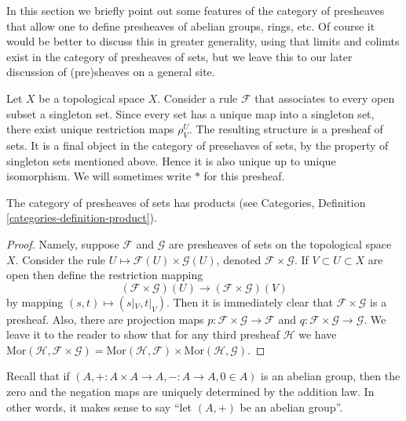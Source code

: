 \noindent
In this section we briefly point out some features of the
category of presheaves that allow one to define presheaves
of abelian groups, rings, etc. Of course it would be better
to discuss this in greater generality, using that limits
and colimts exist in the category of presheaves of sets,
but we leave this to our later discussion of (pre)sheaves
on a general site.

\begin{example}
\label{example-singleton-presheaf}
Let $X$ be a topological space $X$. Consider a rule $\mathcal{F}$ that
associates to every open subset a singleton set. Since every set
has a unique map into a singleton set, there exist unique restriction
maps $\rho^U_V$. The resulting structure is a presheaf of sets.
It is a final object in the category of presehaves of sets, by the
property of singleton sets mentioned above. Hence it is
also unique up to unique isomorphism. We will sometimes write $*$
for this presheaf.
\end{example}

\begin{lemma}
\label{lemma-product-presheaves}
The category of presheaves of sets has products
(see Categories, Definition \ref{categories-definition-product}).
\end{lemma}

\begin{proof}
Namely, suppose $\mathcal{F}$ and $\mathcal{G}$ are
presheaves of sets on the topological space $X$.
Consider the rule $U \mapsto \mathcal{F}(U) \times \mathcal{G}(U)$,
denoted $\mathcal{F}\times \mathcal{G}$. If $V \subset U \subset X$
are open then define the restriction mapping
$$
(\mathcal{F} \times \mathcal{G})(U)
\longrightarrow
(\mathcal{F} \times \mathcal{G})(V)
$$
by mapping $(s, t) \mapsto (s|_V, t|_V)$. Then it is immediately
clear that $\mathcal{F}\times\mathcal{G}$ is a presheaf.
Also, there are projection maps
$p : \mathcal{F}\times\mathcal{G} \to \mathcal{F}$
and 
$q : \mathcal{F}\times\mathcal{G} \to \mathcal{G}$.
We leave it to the reader to show that
for any third presheaf $\mathcal{H}$ we have
$\text{Mor}(\mathcal{H}, \mathcal{F}\times \mathcal{G})
= \text{Mor}(\mathcal{H}, \mathcal{F}) \times
\text{Mor}(\mathcal{H}, \mathcal{G})$.
\end{proof}

\noindent
Recall that if $(A, + : A\times A \to A, - : A \to A, 0\in A)$
is an abelian group, then the zero and the negation maps are
uniquely determined by the addition law. In other words, it
makes sense to say ``let $(A, +)$ be an abelian group''.

